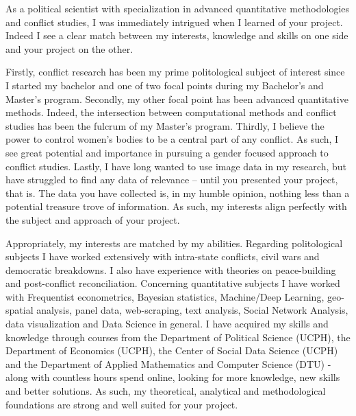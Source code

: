 \documentclass[a4paper]{article}
\begin{document}

As a political scientist with specialization in advanced quantitative methodologies and conflict studies, I was immediately intrigued when I learned of your project. Indeed I see a clear match between my interests, knowledge and skills on one side and your project on the other.\par

Firstly, conflict research has been my prime politological subject of interest since I started my bachelor and one of two focal points during my Bachelor's and Master's program. Secondly, my other focal point has been advanced quantitative methods. Indeed, the intersection between computational methods and conflict studies has been the fulcrum of my Master's program. Thirdly, I believe the power to control women's bodies to be a central part of any conflict. As such, I see great potential and importance in pursuing a gender focused approach to conflict studies. Lastly, I have long wanted to use image data in my research, but have struggled to find any data of relevance -- until you presented your project, that is. The data you have collected is, in my humble opinion, nothing less than a potential treasure trove of information. As such, my interests align perfectly with the subject and approach of your project.\par

Appropriately, my interests are matched by my abilities. Regarding politological subjects I have worked extensively with intra-state conflicts, civil wars and democratic breakdowns. I also have experience with theories on peace-building and post-conflict reconciliation. Concerning quantitative subjects I have worked with Frequentist econometrics, Bayesian statistics, Machine/Deep Learning, geo-spatial analysis, panel data, web-scraping, text analysis, Social Network Analysis, data visualization and Data Science in general. I have acquired my skills and knowledge through courses from the Department of Political Science (UCPH), the Department of Economics (UCPH), the Center of Social Data Science (UCPH) and the Department of Applied Mathematics and Computer Science (DTU) - along with countless hours spend online, looking for more knowledge, new skills and better solutions. As such, my theoretical, analytical and methodological foundations are strong and well suited for your project.\par %
\end{document}
